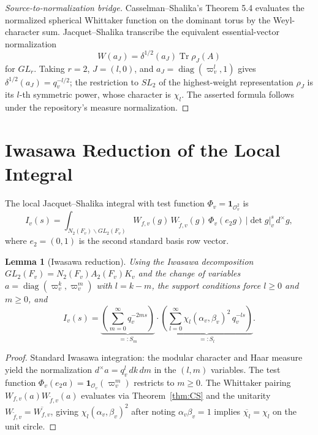 \documentclass[12pt]{article}
\newtheorem{lemma}[theorem]{Lemma}
\DeclareMathOperator{\diag}{diag}
\newcommand{\calO}{\mathcal{O}}
\begin{document}
\begin{proof}[Source-to-normalization bridge]
Casselman--Shalika's Theorem 5.4 evaluates the normalized spherical Whittaker
function on the dominant torus by the Weyl-character sum.  Jacquet--Shalika
transcribe the equivalent essential-vector
normalization
\[
  W(a_J)=\delta^{1/2}(a_J)\operatorname{Tr}\rho_J(A)
\]
for $GL_r$.  Taking $r=2$, $J=(l,0)$, and $a_J=\diag(\varpi_v^l,1)$ gives
$\delta^{1/2}(a_J)=q_v^{-l/2}$; the restriction to $SL_2$ of the
highest-weight representation $\rho_J$ is its $l$-th symmetric power, whose
character is $\chi_l$.  The asserted formula follows under the repository's
measure normalization.
\end{proof}

\section{Iwasawa Reduction of the Local Integral}

The local Jacquet--Shalika integral with test function $\Phi_v = \mathbf{1}_{\calO_v^2}$ is
\[
  I_v(s) = \int_{N_2(F_v) \backslash GL_2(F_v)}
            W_{f,v}(g)\, W_{\tilde f,v}(g)\, \Phi_v(e_2 g)\, |\det g|_v^s\, d^\times g,
\]
where $e_2 = (0,1)$ is the second standard basis row vector.

\begin{lemma}[Iwasawa reduction]\label{lem:iwasawa}
Using the Iwasawa decomposition $GL_2(F_v) = N_2(F_v) A_2(F_v) K_v$ and the change of
variables $a = \diag(\varpi_v^{k}, \varpi_v^{m})$ with $l = k - m$, the support
conditions force $l \geq 0$ and $m \geq 0$, and
\[
  I_v(s) = \underbrace{\left(\sum_{m=0}^\infty q_v^{-2ms}\right)}_{=: S_m}
            \cdot
            \underbrace{\left(\sum_{l=0}^\infty
              \chi_l(\alpha_v, \beta_v)^2\, q_v^{-ls}\right)}_{=: S_l}.
\]
\end{lemma}

\begin{proof}
Standard Iwasawa integration: the modular character and Haar measure yield the
normalization $d^\times a = q_v^l\, dk\, dm$ in the $(l, m)$ variables.  The test
function $\Phi_v(e_2 a) = \mathbf{1}_{\calO_v}(\varpi_v^m)$ restricts to $m \geq 0$.
The Whittaker pairing $W_{f,v}(a) W_{\tilde f,v}(a)$ evaluates via
Theorem~\ref{thm:CS} and the unitarity $W_{\tilde f,v} = \overline{W_{f,v}}$, giving
$\chi_l(\alpha_v,\beta_v)^2$ after noting $\alpha_v \beta_v = 1$ implies
$\overline{\chi_l} = \chi_l$ on the unit circle.
\end{proof}
\end{document}
